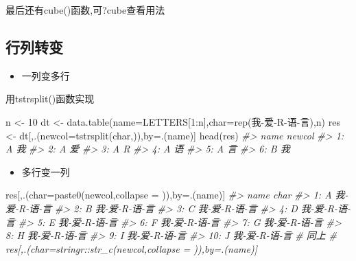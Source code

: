 \documentclass[
]{book}
\newenvironment{Shaded}{\begin{snugshade}}{\end{snugshade}}
\newcommand{\AttributeTok}[1]{\textcolor[rgb]{0.77,0.63,0.00}{#1}}
\newcommand{\CommentTok}[1]{\textcolor[rgb]{0.56,0.35,0.01}{\textit{#1}}}
\newcommand{\DecValTok}[1]{\textcolor[rgb]{0.00,0.00,0.81}{#1}}
\newcommand{\FunctionTok}[1]{\textcolor[rgb]{0.00,0.00,0.00}{#1}}
\newcommand{\NormalTok}[1]{#1}
\newcommand{\OtherTok}[1]{\textcolor[rgb]{0.56,0.35,0.01}{#1}}
\newcommand{\SpecialCharTok}[1]{\textcolor[rgb]{0.00,0.00,0.00}{#1}}
\newcommand{\StringTok}[1]{\textcolor[rgb]{0.31,0.60,0.02}{#1}}
\providecommand{\tightlist}{%
  \setlength{\itemsep}{0pt}\setlength{\parskip}{0pt}}
\begin{document}
最后还有cube()函数,可?cube查看用法

\hypertarget{ux884cux5217ux8f6cux53d8}{%
\subsection{行列转变}\label{ux884cux5217ux8f6cux53d8}}

\begin{itemize}
\tightlist
\item
  一列变多行
\end{itemize}

用tstrsplit()函数实现

\begin{Shaded}
\begin{Highlighting}[]
\NormalTok{n }\OtherTok{\textless{}{-}} \DecValTok{10}
\NormalTok{dt }\OtherTok{\textless{}{-}} \FunctionTok{data.table}\NormalTok{(}\AttributeTok{name=}\NormalTok{LETTERS[}\DecValTok{1}\SpecialCharTok{:}\NormalTok{n],}\AttributeTok{char=}\FunctionTok{rep}\NormalTok{(}\StringTok{\textquotesingle{}我{-}爱{-}R{-}语{-}言\textquotesingle{}}\NormalTok{),n)}
\NormalTok{res }\OtherTok{\textless{}{-}}\NormalTok{ dt[,.(}\AttributeTok{newcol=}\FunctionTok{tstrsplit}\NormalTok{(char,}\StringTok{\textquotesingle{}{-}\textquotesingle{}}\NormalTok{)),by}\OtherTok{=}\NormalTok{.(name)]}
\FunctionTok{head}\NormalTok{(res)}
\CommentTok{\#\textgreater{}    name newcol}
\CommentTok{\#\textgreater{} 1:    A     我}
\CommentTok{\#\textgreater{} 2:    A     爱}
\CommentTok{\#\textgreater{} 3:    A      R}
\CommentTok{\#\textgreater{} 4:    A     语}
\CommentTok{\#\textgreater{} 5:    A     言}
\CommentTok{\#\textgreater{} 6:    B     我}
\end{Highlighting}
\end{Shaded}

\begin{itemize}
\tightlist
\item
  多行变一列
\end{itemize}

\begin{Shaded}
\begin{Highlighting}[]
\NormalTok{res[,.(}\AttributeTok{char=}\FunctionTok{paste0}\NormalTok{(newcol,}\AttributeTok{collapse =} \StringTok{\textquotesingle{}{-}\textquotesingle{}}\NormalTok{)),by}\OtherTok{=}\NormalTok{.(name)]}
\CommentTok{\#\textgreater{}     name          char}
\CommentTok{\#\textgreater{}  1:    A 我{-}爱{-}R{-}语{-}言}
\CommentTok{\#\textgreater{}  2:    B 我{-}爱{-}R{-}语{-}言}
\CommentTok{\#\textgreater{}  3:    C 我{-}爱{-}R{-}语{-}言}
\CommentTok{\#\textgreater{}  4:    D 我{-}爱{-}R{-}语{-}言}
\CommentTok{\#\textgreater{}  5:    E 我{-}爱{-}R{-}语{-}言}
\CommentTok{\#\textgreater{}  6:    F 我{-}爱{-}R{-}语{-}言}
\CommentTok{\#\textgreater{}  7:    G 我{-}爱{-}R{-}语{-}言}
\CommentTok{\#\textgreater{}  8:    H 我{-}爱{-}R{-}语{-}言}
\CommentTok{\#\textgreater{}  9:    I 我{-}爱{-}R{-}语{-}言}
\CommentTok{\#\textgreater{} 10:    J 我{-}爱{-}R{-}语{-}言}
\CommentTok{\# 同上}
\CommentTok{\# res[,.(char=stringr::str\_c(newcol,collapse = \textquotesingle{}{-}\textquotesingle{})),by=.(name)]}
\end{Highlighting}
\end{Shaded}
\end{document}
